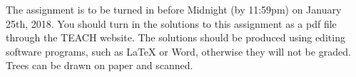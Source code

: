 \documentclass[11pt]{article}
\begin{document}
\raggedright
\newcommand\NAME{Nicholas Jake Jeffreys}  %
\newcommand\ANDREWID{932-221-702}     %
\newcommand\HWNUM{2}              %


The assignment is to be turned in before Midnight (by 11:59pm) on January 25th, 2018.
You should turn in the solutions to this assignment as a pdf file through the TEACH website.
The solutions should be produced using editing software programs, such as LaTeX or Word, otherwise they will not be graded.
Trees can be drawn on paper and scanned.
\end{document}

